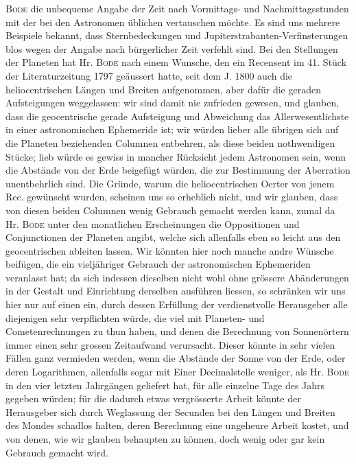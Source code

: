 \textsc{Bode} die unbequeme Angabe der Zeit nach Vormittags- und Nachmittagsstunden mit der bei den Astronomen üblichen vertauschen möchte. Es sind uns mehrere Beispiele bekannt, dass Sternbedeckungen und Jupiterstrabanten-Verfinsterungen blos wegen der Angabe nach bürgerlicher Zeit verfehlt sind. Bei den Stellungen der Planeten hat Hr. \textsc{Bode} nach einem Wunsche, den ein Recensent im 41. Stück der Literaturzeitung 1797 geäussert hatte, seit dem J. 1800 auch die heliocentrischen Längen und Breiten aufgenommen, aber dafür die geraden Aufsteigungen weggelassen: wir sind damit nie zufrieden gewesen, und glauben, dass die geocentrische gerade Aufsteigung und Abweichung das Allerwesentlichste in einer astronomischen Ephemeride ist; wir würden lieber alle übrigen sich auf die Planeten beziehenden Columnen entbehren, als diese beiden nothwendigen Stücke; lieb würde es gewiss in mancher Rücksicht jedem Astronomen sein, wenn die Abstände von der Erde beigefügt würden, die zur Bestimmung der Aberration unentbehrlich sind. Die Gründe, warum die heliocentrischen Oerter von jenem Rec. gewünscht wurden, scheinen uns so erheblich nicht, und wir glauben, dass von diesen beiden Columnen wenig Gebrauch gemacht werden kann, zumal da Hr. \textsc{Bode} unter den monatlichen Erscheinungen die Oppositionen und Conjunctionen der Planeten angibt, welche sich allenfalls eben so leicht aus den geocentrischen ableiten lassen. Wir könnten hier noch manche andre Wünsche beifügen, die ein vieljähriger Gebrauch der astronomischen Ephemeriden veranlasst hat; da sich indessen dieselben nicht wohl ohne grössere Abänderungen in der Gestalt und Einrichtung derselben ausführen liessen, so schränken wir uns hier nur auf einen ein, durch dessen Erfüllung der verdienstvolle Herausgeber alle diejenigen sehr verpflichten würde, die viel mit Planeten- und Cometenrechnungen zu thun haben, und denen die Berechnung von Sonnenörtern immer einen sehr grossen Zeitaufwand verursacht. Dieser könnte in sehr vielen Fällen ganz vermieden werden, wenn die Abstände der Sonne von der Erde, oder deren Logarithmen, allenfalls sogar mit Einer Decimalstelle weniger, als Hr. \textsc{Bode} in den vier letzten Jahrgängen geliefert hat, für alle einzelne Tage des Jahrs gegeben würden; für die dadurch etwas vergrösserte Arbeit könnte der Herausgeber sich durch Weglassung der Secunden bei den Längen und Breiten des Mondes schadlos halten, deren Berechnung eine ungeheure Arbeit kostet, und von denen, wie wir glauben behaupten zu können, doch wenig oder gar kein Gebrauch gemacht wird.

